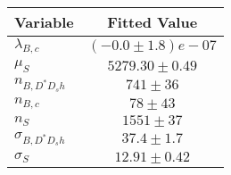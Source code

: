 \begin{tabular}[t]{lc}
\hline
Variable &Fitted Value\\
\hline\hline
$\lambda_{B,c}$&$(-0.0\pm1.8)e-07$\\
\hline
$\mu_S$&$5279.30\pm0.49$\\
\hline
$n_{B, D^* D_s h}$&$741\pm36$\\
\hline
$n_{B,c}$&$78\pm43$\\
\hline
$n_S$&$1551\pm37$\\
\hline
$\sigma_{B, D^* D_s h}$&$37.4\pm1.7$\\
\hline
$\sigma_S$&$12.91\pm0.42$\\
\hline
\end{tabular}